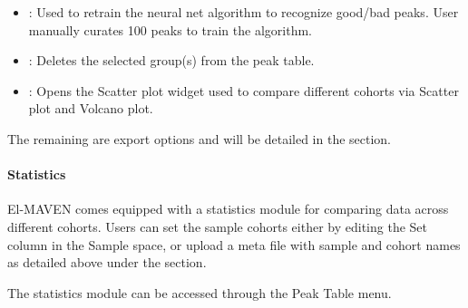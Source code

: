 \documentclass[letterpaper,10pt,english,openany,oneside]{sphinxmanual}
\begin{document}
\begin{itemize}
\item {} 
 : Used to retrain the neural net algorithm to recognize good/bad peaks. User manually curates 100 peaks to train the algorithm.

\item {} 
 : Deletes the selected group(s) from the peak table.

\item {} 
 : Opens the Scatter plot widget used to compare different cohorts via Scatter plot and Volcano plot.

\end{itemize}

The remaining are export options and will be detailed in the  section.


\paragraph{Statistics}
\label{\detokenize{IntroductiontoElMAVENUI:statistics}}
El-MAVEN comes equipped with a statistics module for comparing data across different cohorts. Users can set the sample cohorts either by editing the Set column in the Sample space, or upload a meta file with sample and cohort names as detailed above under the  section.

The statistics module can be accessed through the Peak Table menu.
\end{document}

